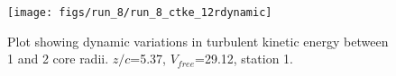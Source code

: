 \begin{figure}[H]
\centering
\texttt{[image: figs/run\_8/run\_8\_ctke\_12rdynamic]}
\caption{Plot showing dynamic variations in turbulent kinetic energy between 1 and 2 core radii. $z/c$=5.37, $V_{free}$=29.12, station 1.}
\label{fig:run_8_ctke_12rdynamic}
\end{figure}


